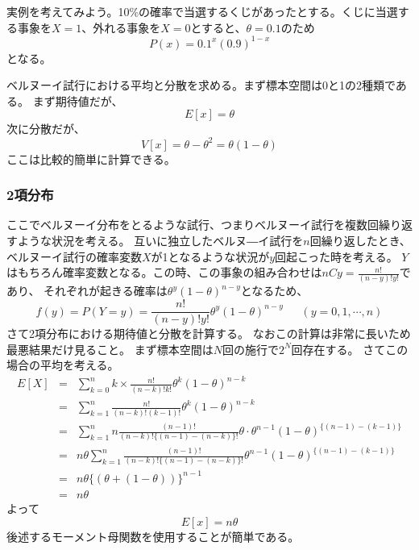 \documentclass[a4paper,10pt]{jarticle}
\begin{document}
実例を考えてみよう。10\%の確率で当選するくじがあったとする。くじに当選する事象を$X=1$、外れる事象を$X=0$とすると、$\theta = 0.1$のため
\begin{equation*}
    P(x) = 0.1^x(0.9)^{1-x}
\end{equation*}
となる。

ベルヌーイ試行における平均と分散を求める。まず標本空間は0と1の2種類である。
まず期待値だが、
\begin{equation}
    E[x] = \theta\tag{3,5}
\end{equation}
次に分散だが、
\begin{equation}
    V[x] = \theta -\theta^2= \theta(1-\theta)\tag{3,6}
\end{equation}
ここは比較的簡単に計算できる。
\subsubsection{2項分布}
ここでベルヌーイ分布をとるような試行、つまりベルヌーイ試行を複数回繰り返すような状況を考える。
互いに独立したベルヌ―イ試行を$n$回繰り返したとき、ベルヌーイ試行の確率変数$X$が1となるような状況が$y$回起こった時を考える。
$Y$はもちろん確率変数となる。この時、この事象の組み合わせは$nCy = \frac{n!}{(n-y)!y!}$であり、
それぞれが起きる確率は$\theta^y (1-\theta)^{n-y}$となるため、
\begin{equation}
    f(y) = P(Y=y)= \frac{n!}{(n-y)!y!}\theta^y (1-\theta)^{n-y}\ \ \ \ \ \ \ (y=0,1,\cdots, n)\tag{3,7}
\end{equation}
さて2項分布における期待値と分散を計算する。
なおこの計算は非常に長いため最悪結果だけ見ること。
まず標本空間は$N$回の施行で$2^N$回存在する。
さてこの場合の平均を考える。
\begin{eqnarray*}
    E[X]&=&\sum_{k=0}^n k\times \frac{n!}{(n-k)!k!}\theta^k (1-\theta)^{n-k}\\
    &=& \sum_{k=1}^n \frac{n!}{(n-k)!(k-1)!}\theta^k (1-\theta)^{n-k}\\
    &=& \sum_{k=1}^n n\frac{(n-1)!}{(n-k)!\{(n-1)-(n-k)\}!}\theta\cdot\theta^{n-1}(1-\theta)^{\{(n-1)-(k-1)\}}\\
    &=& n\theta\sum_{k=1}^n \frac{(n-1)!}{(n-k)!\{(n-1)-(n-k)\}!}\theta^{n-1}(1-\theta)^{\{(n-1)-(k-1)\}}\\
    &=& n\theta\{(\theta+(1-\theta))\}^{n-1}\\
    &=& n\theta
\end{eqnarray*}
よって
\begin{equation}
    E[x] = n\theta\tag{3,8}
\end{equation}
後述するモーメント母関数を使用することが簡単である。
\end{document}
